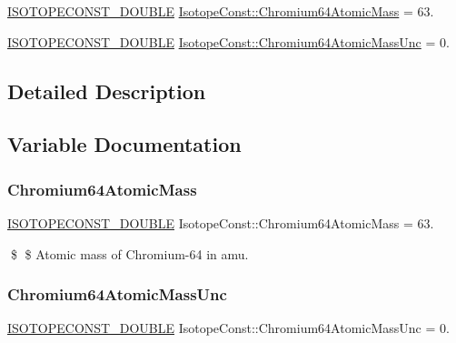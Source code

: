 \begin{DoxyCompactItemize}
\item 
\mbox{\hyperlink{group___isotope_const-_macros_ga8f45a7272ce02c0b4c65c44636ed719a}{I\+S\+O\+T\+O\+P\+E\+C\+O\+N\+S\+T\+\_\+\+D\+O\+U\+B\+LE}} \mbox{\hyperlink{group___isotope_const-_chromium-_cr64_ga27b19a106b2732ea791f79fe64b4a9f2}{Isotope\+Const\+::\+Chromium64\+Atomic\+Mass}} = 63.
\item 
\mbox{\hyperlink{group___isotope_const-_macros_ga8f45a7272ce02c0b4c65c44636ed719a}{I\+S\+O\+T\+O\+P\+E\+C\+O\+N\+S\+T\+\_\+\+D\+O\+U\+B\+LE}} \mbox{\hyperlink{group___isotope_const-_chromium-_cr64_ga0af7531972ef82238f7e875f3e1b3c5b}{Isotope\+Const\+::\+Chromium64\+Atomic\+Mass\+Unc}} = 0.
\end{DoxyCompactItemize}


\subsection{Detailed Description}


\subsection{Variable Documentation}
\mbox{\label{group___isotope_const-_chromium-_cr64_ga27b19a106b2732ea791f79fe64b4a9f2}} 
\subsubsection{\texorpdfstring{Chromium64\+Atomic\+Mass}{Chromium64AtomicMass}}
{\footnotesize\ttfamily \mbox{\hyperlink{group___isotope_const-_macros_ga8f45a7272ce02c0b4c65c44636ed719a}{I\+S\+O\+T\+O\+P\+E\+C\+O\+N\+S\+T\+\_\+\+D\+O\+U\+B\+LE}} Isotope\+Const\+::\+Chromium64\+Atomic\+Mass = 63.}

\$ \$ Atomic mass of Chromium-\/64 in amu. \mbox{\label{group___isotope_const-_chromium-_cr64_ga0af7531972ef82238f7e875f3e1b3c5b}} 
\subsubsection{\texorpdfstring{Chromium64\+Atomic\+Mass\+Unc}{Chromium64AtomicMassUnc}}
{\footnotesize\ttfamily \mbox{\hyperlink{group___isotope_const-_macros_ga8f45a7272ce02c0b4c65c44636ed719a}{I\+S\+O\+T\+O\+P\+E\+C\+O\+N\+S\+T\+\_\+\+D\+O\+U\+B\+LE}} Isotope\+Const\+::\+Chromium64\+Atomic\+Mass\+Unc = 0.}

